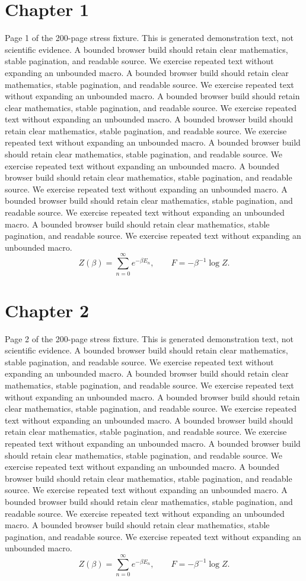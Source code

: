 \documentclass[11pt]{article}
\begin{document}
\section*{Chapter 1}
Page 1 of the 200-page stress fixture. This is generated demonstration text, not scientific evidence.
A bounded browser build should retain clear mathematics, stable pagination, and readable source. We exercise repeated text without expanding an unbounded macro.
A bounded browser build should retain clear mathematics, stable pagination, and readable source. We exercise repeated text without expanding an unbounded macro.
A bounded browser build should retain clear mathematics, stable pagination, and readable source. We exercise repeated text without expanding an unbounded macro.
A bounded browser build should retain clear mathematics, stable pagination, and readable source. We exercise repeated text without expanding an unbounded macro.
A bounded browser build should retain clear mathematics, stable pagination, and readable source. We exercise repeated text without expanding an unbounded macro.
A bounded browser build should retain clear mathematics, stable pagination, and readable source. We exercise repeated text without expanding an unbounded macro.
A bounded browser build should retain clear mathematics, stable pagination, and readable source. We exercise repeated text without expanding an unbounded macro.
A bounded browser build should retain clear mathematics, stable pagination, and readable source. We exercise repeated text without expanding an unbounded macro.
\[Z(\beta)=\sum_{n=0}^{\infty}e^{-\beta E_n},\qquad F=-\beta^{-1}\log Z.\]
\newpage
\section*{Chapter 2}
Page 2 of the 200-page stress fixture. This is generated demonstration text, not scientific evidence.
A bounded browser build should retain clear mathematics, stable pagination, and readable source. We exercise repeated text without expanding an unbounded macro.
A bounded browser build should retain clear mathematics, stable pagination, and readable source. We exercise repeated text without expanding an unbounded macro.
A bounded browser build should retain clear mathematics, stable pagination, and readable source. We exercise repeated text without expanding an unbounded macro.
A bounded browser build should retain clear mathematics, stable pagination, and readable source. We exercise repeated text without expanding an unbounded macro.
A bounded browser build should retain clear mathematics, stable pagination, and readable source. We exercise repeated text without expanding an unbounded macro.
A bounded browser build should retain clear mathematics, stable pagination, and readable source. We exercise repeated text without expanding an unbounded macro.
A bounded browser build should retain clear mathematics, stable pagination, and readable source. We exercise repeated text without expanding an unbounded macro.
A bounded browser build should retain clear mathematics, stable pagination, and readable source. We exercise repeated text without expanding an unbounded macro.
\[Z(\beta)=\sum_{n=0}^{\infty}e^{-\beta E_n},\qquad F=-\beta^{-1}\log Z.\]
\newpage
\end{document}
